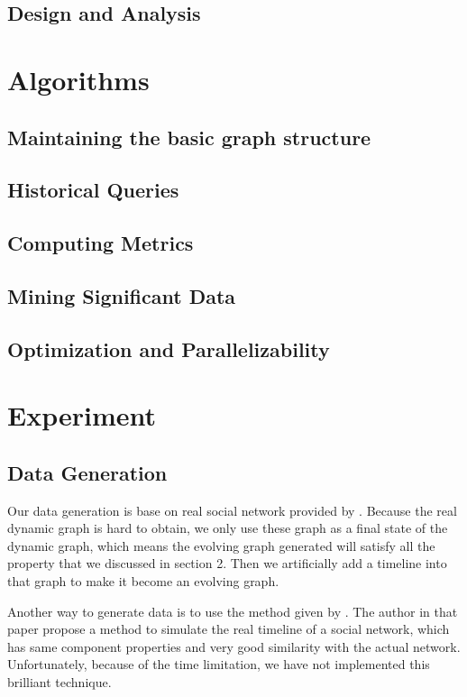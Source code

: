 \documentclass[12pt,abstract=true]{scrartcl}
\numberwithin{equation}{section}
\theoremstyle{definition}   \newtheorem{definition}{Definition}[section]
\theoremstyle{plain}        \newtheorem{theorem}{Theorem}[section]
\theoremstyle{plain}        \newtheorem{observation}{Observation}[section]
\theoremstyle{plain}        \newtheorem{fact}{Fact}[section]
\theoremstyle{plain}        \newtheorem{claim}{Claim}[section]
\theoremstyle{plain}        \newtheorem{lemma}[theorem]{Lemma}
\theoremstyle{plain}        \newtheorem{corollary}[theorem]{Corollary}
\theoremstyle{remark}       \newtheorem{example}{Example}[section]
\theoremstyle{remark}       \newtheorem{remark}{Remark}[section]
\begin{document}
\subsection{Design and Analysis}
\section{Algorithms}
\subsection{Maintaining the basic graph structure}
\subsection{Historical Queries}
\subsection{Computing Metrics}
\subsection{Mining Significant Data}
\subsection{Optimization and Parallelizability}
\section{Experiment}
\subsection{Data Generation} 
Our data generation is base on real social network provided by \cite{database1,
database2}.  Because the real dynamic graph is hard to obtain, we only use
these graph as a final state of the dynamic graph, which means the evolving
graph generated will satisfy all the property that we discussed in section 2.
Then we artificially add a timeline into that graph to make it become an
evolving graph.

Another way to generate data is to use the method given by
\cite{kumar2010structure}.  The author in that paper propose a method to
simulate the real timeline of a social network, which has same component
properties and very good similarity with the actual network.  Unfortunately,
because of the time limitation, we have not implemented this brilliant
technique.
\end{document}
